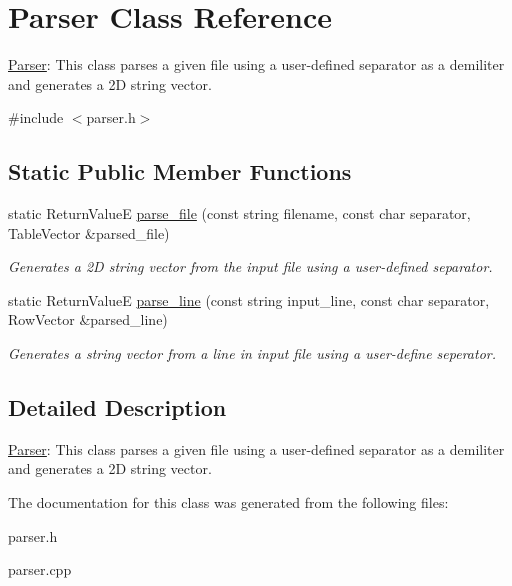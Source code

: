 \hypertarget{classParser}{}\section{Parser Class Reference}
\label{classParser}


\hyperlink{classParser}{Parser}\+: This class parses a given file using a user-\/defined separator as a demiliter and generates a 2\+D string vector.  




{\ttfamily \#include $<$parser.\+h$>$}

\subsection*{Static Public Member Functions}
\begin{DoxyCompactItemize}
\item 
\hypertarget{classParser_a7234c87779b6d22505f6f8849fc31ba1}{}static Return\+Value\+E \hyperlink{classParser_a7234c87779b6d22505f6f8849fc31ba1}{parse\+\_\+file} (const string filename, const char separator, Table\+Vector \&parsed\+\_\+file)\label{classParser_a7234c87779b6d22505f6f8849fc31ba1}

\begin{DoxyCompactList}\small\item\em Generates a 2\+D string vector from the input file using a user-\/defined separator. \end{DoxyCompactList}\item 
\hypertarget{classParser_aad02668636aaa522d63cdcd20035a3f9}{}static Return\+Value\+E \hyperlink{classParser_aad02668636aaa522d63cdcd20035a3f9}{parse\+\_\+line} (const string input\+\_\+line, const char separator, Row\+Vector \&parsed\+\_\+line)\label{classParser_aad02668636aaa522d63cdcd20035a3f9}

\begin{DoxyCompactList}\small\item\em Generates a string vector from a line in input file using a user-\/define seperator. \end{DoxyCompactList}\end{DoxyCompactItemize}


\subsection{Detailed Description}
\hyperlink{classParser}{Parser}\+: This class parses a given file using a user-\/defined separator as a demiliter and generates a 2\+D string vector. 

The documentation for this class was generated from the following files\+:\begin{DoxyCompactItemize}
\item 
parser.\+h\item 
parser.\+cpp\end{DoxyCompactItemize}
